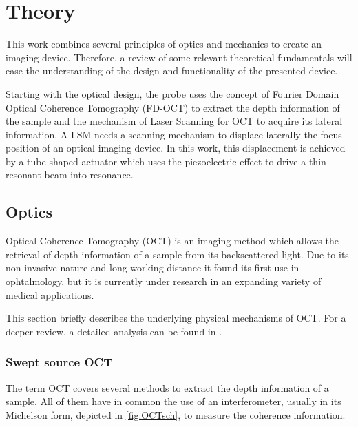 
\chapter{Theory}
\label{Ch:Theory}	

This work combines several principles of optics and mechanics to create an imaging device. Therefore, a review of some relevant theoretical fundamentals will ease the understanding of the design and functionality of the presented device.

Starting with the optical design, the probe uses the concept of Fourier Domain Optical Coherence Tomography (FD-OCT) to extract the depth information of the sample and the mechanism of Laser Scanning for OCT to acquire its lateral information. A LSM needs a scanning mechanism to displace laterally the focus position of an optical imaging device. In this work, this displacement is achieved by a tube shaped actuator which uses the piezoelectric effect to drive a thin resonant beam into resonance.

\section{Optics}
Optical Coherence Tomography (OCT) is an imaging method which allows the retrieval of depth information of a sample from its backscattered light.  Due to its non-invasive nature and long working distance it found its first use in ophtalmology, but it is currently under research in an expanding variety of medical applications. 

This section briefly describes the underlying physical mechanisms of OCT. For a deeper review, a detailed analysis can be found in \cite{Drexler2008}.

\subsection{Swept source OCT}
The term OCT covers several methods to extract the depth information of a sample. All of them have in common the use of an interferometer, usually in its Michelson form, depicted in \autoref{fig:OCTsch}, to measure the coherence information.

